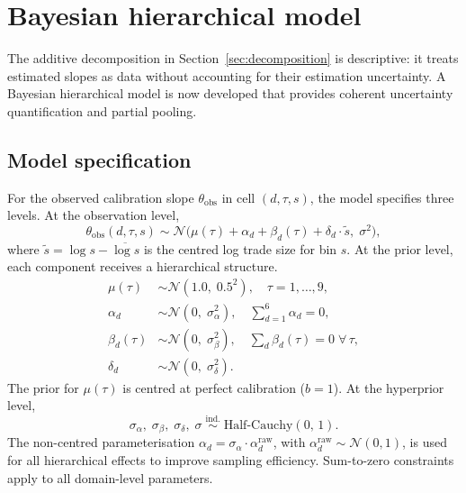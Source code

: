 \documentclass[numsec,webpdf,modern,medium]{oup-authoring-template}
\theoremstyle{thmstyleone}%
\theoremstyle{thmstyletwo}%
\theoremstyle{thmstylethree}%
\begin{document}
\section{Bayesian hierarchical model}\label{sec:bayesian}

The additive decomposition in Section~\ref{sec:decomposition} is descriptive: it treats estimated slopes as data without accounting for their estimation uncertainty. A Bayesian hierarchical model is now developed that provides coherent uncertainty quantification and partial pooling.
\subsection{Model specification}\label{sec:bayesian_spec}

For the observed calibration slope $\theta_{\mathrm{obs}}$ in cell $(d, \tau, s)$, the model specifies three levels. At the observation level,
\begin{equation}\label{eq:bayesian}
\theta_{\mathrm{obs}}(d, \tau, s) \sim \mathcal{N}\bigl(\mu(\tau) + \alpha_d + \beta_d(\tau) + \delta_d \cdot \tilde{s},\; \sigma^2\bigr),
\end{equation}
where $\tilde{s} = \log s - \overline{\log s}$ is the centred log trade size for bin $s$. At the prior level, each component receives a hierarchical structure.
\begin{align}
\mu(\tau) &\sim \mathcal{N}(1.0,\; 0.5^2), \quad \tau = 1, \ldots, 9, \label{eq:prior_mu}\\
\alpha_d &\sim \mathcal{N}(0,\; \sigma_\alpha^2), \quad \sum_{d=1}^{6}\alpha_d = 0, \label{eq:prior_alpha}\\
\beta_d(\tau) &\sim \mathcal{N}(0,\; \sigma_\beta^2), \quad \sum_{d}\beta_d(\tau) = 0 \;\forall\, \tau, \label{eq:prior_beta}\\
\delta_d &\sim \mathcal{N}(0,\; \sigma_\delta^2). \label{eq:prior_delta}
\end{align}
The prior for $\mu(\tau)$ is centred at perfect calibration ($b = 1$). At the hyperprior level,
\begin{equation}\label{eq:hyperprior}
\sigma_\alpha,\; \sigma_\beta,\; \sigma_\delta,\; \sigma \;\overset{\mathrm{ind.}}{\sim}\; \mathrm{Half\text{-}Cauchy}(0,\, 1).
\end{equation}
The non-centred parameterisation $\alpha_d = \sigma_\alpha \cdot \alpha_d^{\mathrm{raw}}$, with $\alpha_d^{\mathrm{raw}} \sim \mathcal{N}(0,1)$, is used for all hierarchical effects to improve sampling efficiency. Sum-to-zero constraints apply to all domain-level parameters.
\end{document}

